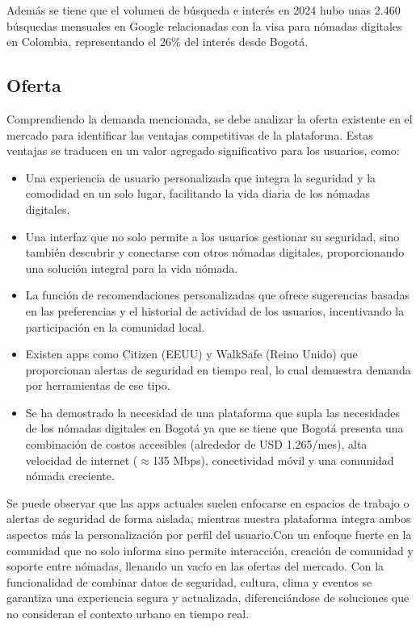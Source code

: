 Además se tiene que el volumen de búsqueda e interés en 2024 hubo unas 2.460 búsquedas mensuales en Google relacionadas con la visa para nómadas digitales en Colombia, representando el 26\% del interés desde Bogotá.\cite{volumen_nomadas_digitales}



\subsection*{Oferta}
Comprendiendo la demanda mencionada, se debe analizar la oferta existente en el mercado para identificar las ventajas competitivas de la plataforma. Estas ventajas se traducen en un valor agregado significativo para los usuarios, como:
\begin{itemize}
    \item Una experiencia de usuario personalizada que integra la seguridad y la comodidad en un solo lugar, facilitando la vida diaria de los nómadas digitales.
    
    \item Una interfaz que no solo permite a los usuarios gestionar su seguridad, sino también descubrir y conectarse con otros nómadas digitales, proporcionando una solución integral para la vida nómada.
    
    \item La función de recomendaciones personalizadas que ofrece sugerencias basadas en las preferencias y el historial de actividad de los usuarios, incentivando la participación en la comunidad local.
    \item Existen apps como Citizen (EEUU) y WalkSafe (Reino Unido) que proporcionan alertas de seguridad en tiempo real, lo cual demuestra demanda por herramientas de ese tipo.
    \item Se ha demostrado la necesidad de una plataforma que supla las necesidades de los nómadas digitales en Bogotá ya que se tiene que Bogotá presenta una combinación de costos accesibles (alrededor de USD 1.265/mes), alta velocidad de internet ($\approx$135 Mbps), conectividad móvil y una comunidad nómada creciente.\cite{entorno_nomadas_digitales}
\end{itemize}

Se puede observar que las apps actuales suelen enfocarse en espacios de trabajo o alertas de seguridad de forma aislada, mientras nuestra plataforma integra ambos aspectos más la personalización por perfil del usuario.Con un enfoque fuerte en la comunidad que no solo informa sino permite interacción, creación de comunidad y soporte entre nómadas, llenando un vacío en las ofertas del mercado.
Con la funcionalidad de combinar datos de seguridad, cultura, clima y eventos se garantiza una experiencia segura y actualizada, diferenciándose de soluciones que no consideran el contexto urbano en tiempo real.

